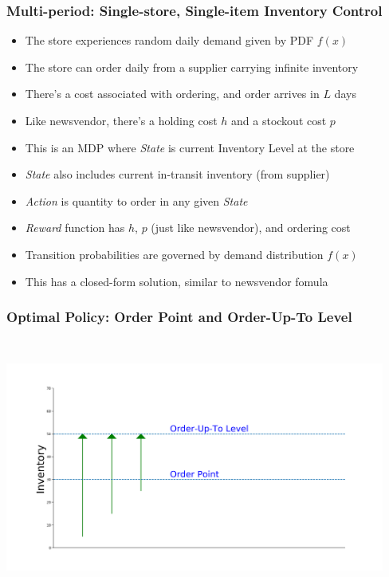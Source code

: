 \documentclass[handout]{beamer}
\begin{document}
\begin{frame}
\frametitle{Multi-period: Single-store, Single-item Inventory Control}
\pause
\begin{itemize}[<+->]
\item The store experiences random daily demand given by PDF $f(x)$
\item The store can order daily from a supplier carrying infinite inventory
\item There's a cost associated with ordering, and order arrives in $L$ days
\item Like newsvendor, there's a holding cost $h$ and a stockout cost $p$
\item This is an MDP where {\em State} is current Inventory Level at the store
\item {\em State} also includes current in-transit inventory (from supplier)
\item {\em Action} is quantity to order in any given {\em State}
\item {\em Reward} function has $h$, $p$ (just like newsvendor), and ordering cost
\item Transition probabilities are governed by demand distribution $f(x)$
\item This has a closed-form solution, similar to newsvendor fomula
\end{itemize}
\end{frame}

\begin{frame}
\frametitle{Optimal Policy: Order Point and Order-Up-To Level}
\includegraphics[width=12.5cm, height=8.5cm]{op_otl.png}
\end{frame}
\end{document}
